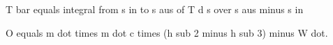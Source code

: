 T bar equals integral from s in to s aus of T d s over s aus minus s in

O equals m dot times m dot c times (h sub 2 minus h sub 3) minus W dot.
